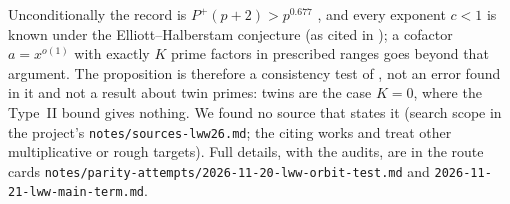 Unconditionally the record is $P^+(p+2)>p^{0.677}$ \cite{BH98}, and every exponent
$c<1$ is known under the Elliott--Halberstam conjecture (as cited in \cite{Din25});
a cofactor $a=x^{o(1)}$ with exactly $K$ prime factors in prescribed ranges goes
beyond that argument. The proposition is therefore a consistency test of
\cite[Prop.~4.2]{LWW26}, not an error found in it and not a result about twin
primes: twins are the case $K=0$, where the Type~II bound gives nothing. We found no
source that states it (search scope in the project's \texttt{notes/sources-lww26.md};
the citing works \cite{HLWW26} and \cite{Wan26} treat other multiplicative or
rough targets). Full details, with the audits, are in the route cards
\texttt{notes/parity-attempts/2026-11-20-lww-orbit-test.md} and
\texttt{2026-11-21-lww-main-term.md}.

